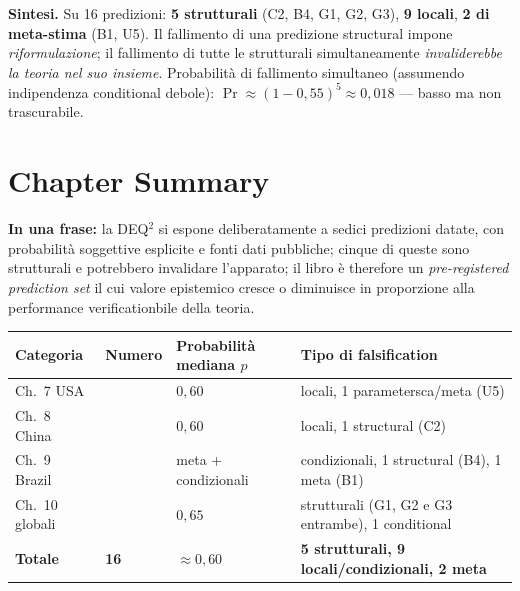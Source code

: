 \Proved{} \textbf{Sintesi.} Su 16 predizioni: \textbf{5 strutturali}
(C2, B4, G1, G2, G3), \textbf{9 locali}, \textbf{2 di meta-stima} (B1,
U5). Il fallimento di una predizione structural impone
\emph{riformulazione}; il fallimento di tutte le strutturali
simultaneamente \emph{invaliderebbe la teoria nel suo insieme}.
Probabilità di fallimento simultaneo (assumendo indipendenza
conditional debole): \(\Pr \approx (1-0{,}55)^5 \approx 0{,}018\) ---
basso ma non trascurabile.



\section{Chapter Summary}\label{sintesi-del-chapter}

\Proved{} \textbf{In una frase:} la DEQ$^2$ si espone deliberatamente a
sedici predizioni datate, con probabilità soggettive esplicite e fonti
dati pubbliche; cinque di queste sono strutturali e potrebbero
invalidare l'apparato; il libro è therefore un \emph{pre-registered
prediction set} il cui valore epistemico cresce o diminuisce in
proporzione alla performance verificationbile della teoria.

{\def\LTcaptype{none} %
{\small\begin{longtable}[]{@{}
  >{\raggedright\arraybackslash}p{}
  >{\raggedright\arraybackslash}p{}
  >{\raggedright\arraybackslash}p{}
  >{\raggedright\arraybackslash}p{}@{}}
\toprule\noalign{}
\begin{minipage}[b]{\linewidth}\raggedright
Categoria
\end{minipage} & \begin{minipage}[b]{\linewidth}\raggedright
Numero
\end{minipage} & \begin{minipage}[b]{\linewidth}\raggedright
Probabilità mediana \(p\)
\end{minipage} & \begin{minipage}[b]{\linewidth}\raggedright
Tipo di falsification
\end{minipage} \\
\midrule\noalign{}
\endhead
\bottomrule\noalign{}
\endlastfoot
Ch.~7 USA & 5 & \(0{,}60\) & 4 locali, 1 parametersca/meta (U5) \\
Ch.~8 China & 4 & \(0{,}60\) & 3 locali, 1 structural (C2) \\
Ch.~9 Brazil & 4 & meta + condizionali & 2 condizionali, 1 structural
(B4), 1 meta (B1) \\
Ch.~10 globali & 3 & \(0{,}65\) & 2 strutturali (G1, G2 e G3 entrambe),
1 conditional \\
\textbf{Totale} & \textbf{16} & \(\approx 0{,}60\) & \textbf{5
strutturali, 9 locali/condizionali, 2 meta} \\
\end{longtable}}
}

